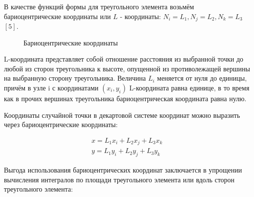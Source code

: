 \documentclass[a4paper, 14pt]{extarticle}
\begin{document}
В качестве функций формы для треугольного элемента возьмём бариоцентрические координаты или $L$ - координаты: $N_i = L_1, N_j = L_2, N_k = L_3$ $\left[5\right]$. 

\newpage

\begin{figure}[h]
\caption{Бариоцентрические координаты}
\label{fig:bario}
\end{figure}

L-координата представляет собой отношение расстояния из выбранной точки до любой из сторон треугольника к высоте, опущенной из противолежащей вершины на выбранную сторону треугольника. Величина $L_i$ меняется от нуля до единицы, причём в узле i с координатами $(x_i, y_i)$ L-координата равна единице, в то время как в прочих вершинах треугольника бариоцентрическая координата равна нулю.

Координаты случайной точки в декартовой системе координат можно выразить через бариоцентрические координаты:

\begin{eqnarray*}
x = L_1 x_i + L_2 x_j + L_3 x_k \\
y = L_1 y_i + L_2 y_j + L_3 y_k
\end{eqnarray*}

Выгода использования бариоцентрических координат заключается в упрощении вычисления интегралов по площади треугольного элемента или вдоль сторон треугольного элемента:
\end{document}
